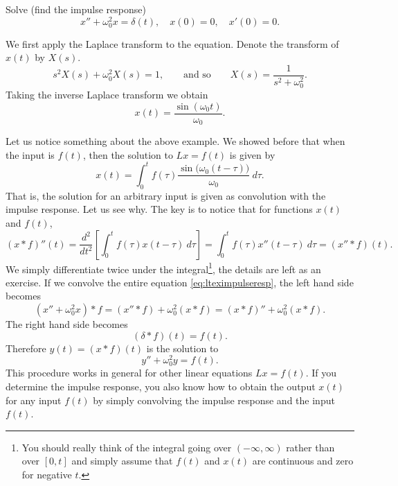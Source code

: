 \documentclass[12pt]{book}
\begin{document}
\begin{example}
Solve (find the impulse response)
\begin{equation} \label{eq:lteximpulseresp}
x'' + \omega_0^2 x = \delta(t) , \quad x(0) = 0, \quad x'(0) = 0 .
\end{equation}

We first apply the Laplace transform to the equation.  Denote
the transform of $x(t)$ by $X(s)$.
\begin{equation*}
s^2 X(s) + \omega_0^2 X(s) = 1 ,
\qquad \text{and so} \qquad
X(s) = \frac{1}{s^2+ \omega_0^2} .
\end{equation*}
Taking the inverse Laplace transform we obtain
\begin{equation*}
x(t) = 
\frac{\sin (\omega_0 t)}{\omega_0} .
\end{equation*}
\end{example}

Let us notice something about the above example.  We showed before that
when the input is $f(t)$, then the solution to $Lx = f(t)$
is given by
\begin{equation*}
x(t) = 
\int_0^t
f(\tau) 
\frac{\sin \bigl( \omega_0 (t-\tau) \bigr)}{\omega_0} ~ d\tau .
\end{equation*}
That is, the solution for an arbitrary input is given as
convolution with the impulse response.  Let us see why.
The key is to notice that for functions $x(t)$ and $f(t)$,
\begin{equation*}
(x * f)''(t) =
\frac{d^2}{dt^2}\left[
\int_0^t
f(\tau) 
x(t-\tau) ~ d\tau \right]
=
\int_0^t
f(\tau) 
x''(t-\tau) ~ d\tau
= (x'' * f)(t) .
\end{equation*}
We simply differentiate twice under the
integral\footnote{You should really think of the integral going over
$(-\infty,\infty)$ rather than over $[0,t]$ and simply assume that $f(t)$ and
$x(t)$ are continuous and zero for negative $t$.}, the details are
left as an exercise.
If we convolve the entire equation \eqref{eq:lteximpulseresp},
the left hand side becomes
\begin{equation*}
(x'' + \omega_0^2 x) * f =
(x'' * f) + \omega_0^2 (x * f) =
(x * f)'' + \omega_0^2 (x * f) .
\end{equation*}
The right hand side becomes
\begin{equation*}
(\delta * f)(t) = f(t).
\end{equation*}
Therefore $y(t) = (x * f)(t)$ is the solution to
\begin{equation*}
y'' + \omega_0^2 y = f(t) .
\end{equation*}
This procedure works in general for other linear
equations $Lx = f(t)$.  If you determine the impulse response,
you also know how to obtain the output $x(t)$ for any input $f(t)$
by simply convolving
the impulse response and the input $f(t)$.
\end{document}
